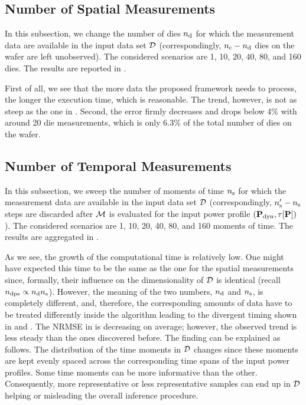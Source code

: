 \subsection{Number of Spatial Measurements}
In this subsection, we change the number of dies ${n_{\text{d}}}$ for which the measurement data are available in the input data set $\mathcal{D}$ (correspondingly, ${n_{\text{c}}} - {n_{\text{d}}}$ dies on the wafer are left unobserved). The considered scenarios are 1, 10, 20, 40, 80, and 160 dies. The results are reported in .


First of all, we see that the more data the proposed framework needs to process, the longer the execution time, which is reasonable. The trend, however, is not as steep as the one in . Second, the error firmly decreases and drops below $4\%$ with around 20 die measurements, which is only $6.3\%$ of the total number of dies on the wafer.

\subsection{Number of Temporal Measurements}
In this subsection, we sweep the number of moments of time ${n_\text{s}}$ for which the measurement data are available in the input data set $\mathcal{D}$ (correspondingly, ${n_\text{s}'} - {n_\text{s}}$ steps are discarded after $\model$ is evaluated for the input power profile $(\mathbf{P}_{\text{dyn}}, \tau[\mathbf{P}])$). The considered scenarios are 1, 10, 20, 40, 80, and 160 moments of time. The results are aggregated in .


As we see, the growth of the computational time is relatively low. One might have expected this time to be the same as the one for the spatial measurements since, formally, their influence on the dimensionality of $\mathcal{D}$ is identical (recall ${n_\text{dps}} \propto {n_{\text{d}}} {n_\text{s}}$). However, the meaning of the two numbers, ${n_{\text{d}}}$ and ${n_\text{s}}$, is completely different, and, therefore, the corresponding amounts of data have to be treated differently inside the algorithm leading to the divergent timing shown in  and . The NRMSE in  is decreasing on average; however, the observed trend is less steady than the ones discovered before. The finding can be explained as follows. The distribution of the time moments in $\mathcal{D}$ changes since these moments are kept evenly spaced across the corresponding time spans of the input power profiles. Some time moments can be more informative than the other. Consequently, more representative or less representative samples can end up in $\mathcal{D}$ helping or misleading the overall inference procedure.

